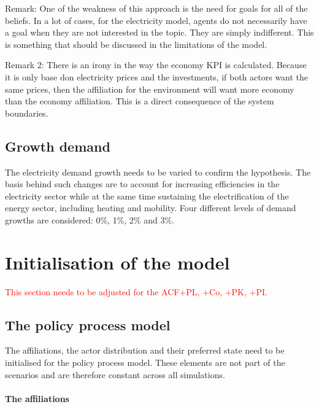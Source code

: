 \documentclass[12pt]{article}
\begin{document}
Remark: One of the weakness of this approach is the need for goals for all of the beliefs. In a lot of cases, for the electricity model, agents do not necessarily have a goal when they are not interested in the topic. They are simply indifferent. This is something that should be discussed in the limitations of the model.

Remark 2: There is an irony in the way the economy KPI is calculated. Because it is only base don electricity prices and the investments, if both actors want the same prices, then the affiliation for the environment will want more economy than the economy affiliation. This is a direct consequence of the system boundaries.


\subsection{Growth demand}

The electricity demand growth needs to be varied to confirm the hypothesis. The basis behind such changes are to account for increasing efficiencies in the electricity sector while at the same time sustaining the electrification of the energy sector, including heating and mobility. Four different levels of demand growths are considered: 0\%, 1\%, 2\% and 3\%. 



\section{Initialisation of the model}
\label{sec:elec_initialisation}

\textcolor{red}{This section needs to be adjusted for the ACF+PL, +Co, +PK, +PI.}


\subsection{The policy process model}

The affiliations, the actor distribution and their preferred state need to be initialised for the policy process model. These elements are not part of the scenarios and are therefore constant across all simulations.

\paragraph{The affiliations}
\end{document}
